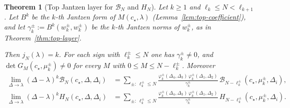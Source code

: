 \documentclass[twoside,10pt]{article}
\numberwithin{equation}{section}
\theoremstyle{slbody}
\newtheorem{theorem}{Theorem}[section]
\theoremstyle{definition}
\theoremstyle{remark}
\begin{document}
\begin{theorem}[Top Jantzen layer for \(\mathcal B_N\) and \(H_N\)]
\label{thm:top-layer-sph}
Let \(k\geq1\) and \(\ell_k\leq N<\ell_{k+1}\).  Let \(B^k\) be the \(k\)-th
Jantzen form of \(M(c_\star,\lambda)\) (Lemma~\ref{lem:top-coefficient}), and let
\(\gamma^\pm_k:=B^k(w^\pm_k,w^\pm_k)\) be the \(k\)-th Jantzen norms of
\(w^\pm_k\), as in Theorem~\ref{thm:top-layer}.

Then \(j_N(\lambda)=k\).  For each sign with \(\ell^\pm_k\leq N\) one has
\(\gamma^\pm_k\neq0\), and \(\det G_M(c_\star,\mu^\pm_k)\neq0\) for every
\(M\) with \(0\leq M\leq N-\ell^\pm_k\).  Moreover
\begin{align}
 \lim_{\Delta\to\lambda}(\Delta-\lambda)^k\mathcal B_N(c_\star,\Delta,\Delta_i)
 &=\sum_{\pm:\ \ell^\pm_k\leq N}
   \frac{\varphi^\pm_k(\Delta_4,\Delta_3)\,\varphi^\pm_k(\Delta_1,\Delta_2)}{\gamma^\pm_k}\,
   \mathcal B_{N-\ell^\pm_k}(c_\star,\mu^\pm_k,\Delta_i),
 \label{eq:top-B}\\
 \lim_{\Delta\to\lambda}(\Delta-\lambda)^k H_N(c_\star,\Delta,\Delta_i)
 &=\sum_{\pm:\ \ell^\pm_k\leq N}
   \frac{\varphi^\pm_k(\Delta_4,\Delta_3)\,\varphi^\pm_k(\Delta_1,\Delta_2)}{\gamma^\pm_k}\,
   H_{N-\ell^\pm_k}(c_\star,\mu^\pm_k,\Delta_i).
 \label{eq:top-H}
\end{align}
\end{theorem}
\end{document}
